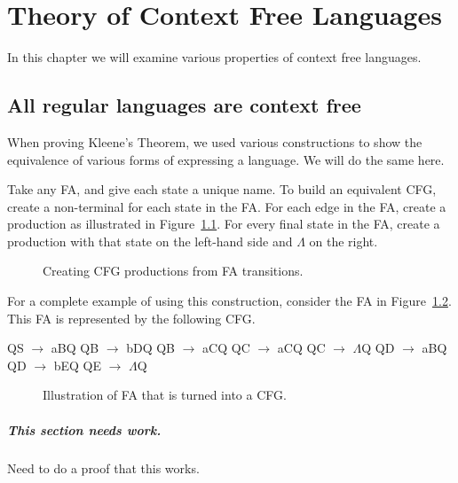 \documentclass[letterpaper,12pt,openany,reqno]{book}%
\newcommand{\cfgprod}[2] {{\ttfamily #1} $\rightarrow$ {\ttfamily #2}}
\newcommand{\needswork}{\paragraph{This section needs work.}}
\newcommand{\fanonterminalnode}[2] {\node at (#1) (#2) [circle, draw, minimum size=24pt] {#2};}
\newcommand{\fatransition}[3] {\draw [->] (#1) -- (#2) node [midway, above] {#3};}
\newcommand{\farighttransition}[3] {\draw [->] (#1) -- (#2) node [midway, right] {#3};}
\newcommand{\faarctransition}[5] {\draw [->] (#1) to[out=#4, in=#5] node  [midway, above] {#3} (#2) ;}
\newcommand{\faloopright}[2] {\draw (#1) edge [loop right] node {#2} ();}
\begin{document}
\chapter{Theory of Context Free Languages}
In this chapter we will examine various properties of context free languages.
\section{All regular languages are context free}
When proving Kleene's Theorem, we used various constructions to show the equivalence of various forms of expressing a language. We will do the same here.

Take any FA, and give each state a unique name. To build an equivalent CFG, create a non-terminal for each state in the FA. For each edge in the FA, create a production as illustrated in Figure~\ref{F.FA.2.CFG}. For every final state in the FA, create a production with that state on the left-hand side and $\Lambda$ on the right.
\begin{figure}[hbt]
\centering
{}
 \caption{Creating CFG productions from FA transitions.}
  \label{F.FA.2.CFG}
\end{figure}
For a complete example of using this construction, consider the FA in Figure~\ref{F.FA.to.CFG.example}. This FA is represented by the following CFG.
\begin{cfg}{}{}
Q\cfgprod{S}{aB}Q
Q\cfgprod{B}{bD}Q
Q\cfgprod{B}{aC}Q
Q\cfgprod{C}{aC}Q
Q\cfgprod{C}{$\Lambda$}Q
Q\cfgprod{D}{aB}Q
Q\cfgprod{D}{bE}Q
Q\cfgprod{E}{$\Lambda$}Q
\end{cfg}

\begin{figure}[hbt]
\centering
{}
 \caption{Illustration of FA that is turned into a CFG.}
  \label{F.FA.to.CFG.example}
\end{figure}
\needswork
Need to do a proof that this works.
\end{document}
